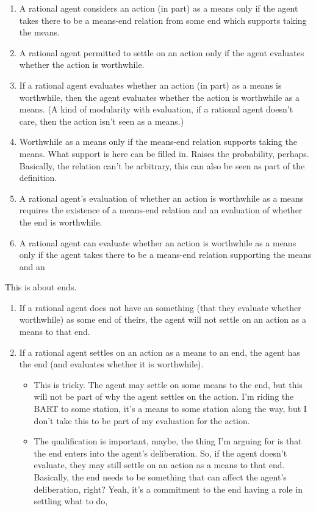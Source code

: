 \documentclass[10pt]{article}
\newcommand{\hozlinedash}[0]{%
  \noindent\hdashrule[0.5ex][c]{\textwidth}{.1pt}{2.5pt}
}
\begin{document}
\begin{enumerate}
\item A rational agent considers an action (in part) as a means only if the agent takes there to be a means-end relation from some end which supports taking the means. %
\item A rational agent permitted to settle on an action only if the agent evaluates whether the action is worthwhile.
\item If a rational agent evaluates whether an action (in part) as a means is worthwhile, then the agent evaluates whether the action is worthwhile as a means. (A kind of modularity with evaluation, if a rational agent doesn't care, then the action isn't seen as a means.)
\item Worthwhile as a means only if the means-end relation supports taking the means.
  What support is here can be filled in.
  Raises the probability, perhaps.
  Basically, the relation can't be arbitrary, this can also be seen as part of the definition.
\item A rational agent's evaluation of whether an action is worthwhile as a means requires the existence of a means-end relation and an evaluation of whether the end is worthwhile.
\item A rational agent can evaluate whether an action is worthwhile as a means only if the agent takes there to be a means-end relation supporting the means and an
\end{enumerate}


\hozlinedash

This is about ends.
\begin{enumerate}
\item If a rational agent does not have an something (that they evaluate whether worthwhile) as some end of theirs, the agent will not settle on an action as a means to that end.
\item If a rational agent settles on an action as a means to an end, the agent has the end (and evaluates whether it is worthwhile).
  \begin{itemize}
  \item This is tricky.
    The agent may settle on some means to the end, but this will not be part of why the agent settles on the action.
    I'm riding the BART to some station, it's a means to some station along the way, but I don't take this to be part of my evaluation for the action.
  \item The qualification is important, maybe, the thing I'm arguing for is that the end enters into the agent's deliberation.
    So, if the agent doesn't evaluate, they may still settle on an action as a means to that end.
    Basically, the end needs to be something that can affect the agent's deliberation, right?
    Yeah, it's a commitment to the end having a role in settling what to do, 
  \end{itemize}
\end{enumerate}
\end{document}
